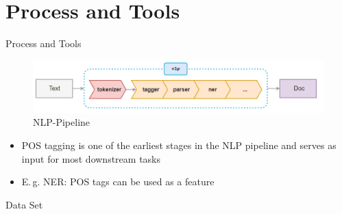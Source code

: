 \section{Process and Tools}

\begin{frame}{Process and Tools}{}
	\begin{figure}
		\includegraphics[scale=0.4]{img/nlp_pipeline}
		\caption{NLP-Pipeline}
	\end{figure}

	\begin{itemize}
		\item POS tagging is one of the earliest stages in the NLP pipeline and serves as input for most
			downstream tasks
		\item E.\,g. NER: POS tags can be used as a feature 
	\end{itemize}
\end{frame}


\begin{frame}{Data Set}{}
\end{frame}


